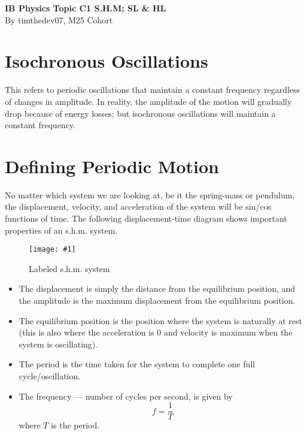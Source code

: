\documentclass[a4paper,12pt]{article}
\let\oldsection\section
\renewcommand\section{\clearpage\oldsection}
\newcommand{\img}[4]{\begin{center}
  \begin{figure}[H]
    \centering
    \texttt{[image: \#1]}
    \caption{#3}
    \label{fig:#4}
  \end{figure}
\end{center}}
\begin{document}
\pagestyle{fancy}


\begin{titlepage}
  \begin{center}

    \vspace*{8cm}
    \textbf{\Large {IB Physics Topic C1 S.H.M; SL \& HL}} \\
    \vspace*{1cm}
    \large{By timthedev07, M25 Cohort}


  \end{center}
\end{titlepage}

\pagebreak
\tableofcontents
\pagebreak

\clearpage
\setcounter{page}{1}

\section{Isochronous Oscillations}

This refers to periodic oscillations that maintain a constant frequency regardless of changes in amplitude. In reality, the amplitude of the motion will gradually drop because of energy losses; but isochronous oscillations will maintain a constant frequency.

\section{Defining Periodic Motion}
No matter which system we are looking at, be it the spring-mass or pendulum, the displacement, velocity, and acceleration of the system will be sin/cos functions of time. The following displacement-time diagram shows important properties of an s.h.m. system.
\img{graphlabeledintro.png}{0.8}{Labeled s.h.m. system}{graphlabeledintro}
\begin{itemize}
  \item The displacement is simply the distance from the equilibrium position, and the amplitude is the maximum displacement from the equilibrium position.
  \item The equilibrium position is the position where the system is naturally at rest (this is also where the acceleration is 0 and velocity is maximum when the system is oscillating).
  \item The period is the time taken for the system to complete one full cycle/oscillation.
  \item The frequency --- number of cycles per second, is given by
        $$f = \frac{1}{T}$$
        where $T$ is the period.
\end{itemize}
\end{document}
